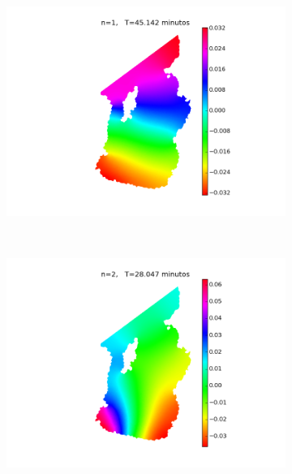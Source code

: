 \begin{figure}
  \begin{subfigure}{0.5\textwidth}
    \includegraphics[width=\textwidth]{figuras/modos1.png}
  \end{subfigure}
  ~
  \begin{subfigure}{0.5\textwidth}
    \includegraphics[width=\textwidth]{figuras/modos2.png}
  \end{subfigure}
  ~
  \begin{subfigure}{0.5\textwidth}

\end{subfigure}
\end{figure}
